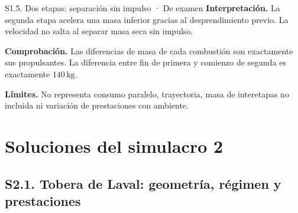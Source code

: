 \begin{studiumworked}{S1.5. Dos etapas: separación sin impulso · De examen}
\textbf{Interpretación.} La segunda etapa acelera una masa inferior gracias al desprendimiento previo. La velocidad no salta al separar masa seca sin impulso.

\textbf{Comprobación.} Las diferencias de masa de cada combustión son exactamente sus propulsantes. La diferencia entre fin de primera y comienzo de segunda es exactamente $140\,\mathrm{kg}$.

\textbf{Límites.} No representa consumo paralelo, trayectoria, masa de interetapas no incluida ni variación de prestaciones con ambiente.
\end{studiumworked}
\chapter{Soluciones del simulacro 2}
\section{S2.1. Tobera de Laval: geometría, régimen y prestaciones}
